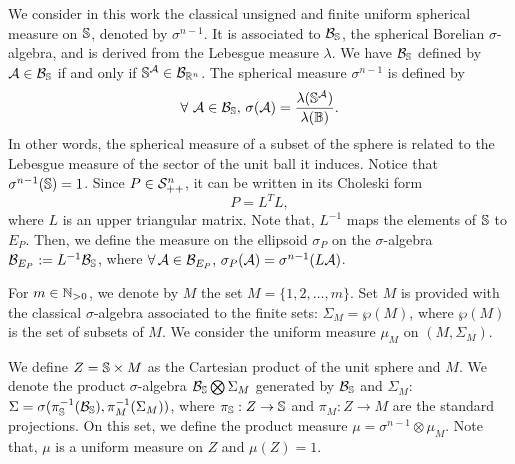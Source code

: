 We consider in this work the classical unsigned and finite uniform spherical measure on $\mathbb{S}$, denoted by $\sigma^{n-1}$. It is associated to $\mathcal{B}_{\mathbb{S}}$, the spherical Borelian $\sigma$-algebra, and is derived from the Lebesgue measure $\lambda$. We have $\mathcal{B}_{\mathbb{S}}$ defined by $\mathcal{A} \in \mathcal{B}_{\mathbb{S}}$ if and only if $\mathbb{S}^{\mathcal{A}} \in \mathcal{B}_{\mathbb{R}^n}$. The spherical measure $\sigma^{n-1}$ is defined by
$$\forall\ \mathcal{A} \in \mathcal{B}_{\mathbb{S}},\, \sigma(\mathcal{A}) = \frac{\lambda(\mathbb{S}^{\mathcal{A}})}{\lambda(\mathbb{B})}. $$
In other words, the spherical measure of a subset of the sphere is related to the Lebesgue measure of the sector of the unit ball it induces. Notice that $\sigma^{n-1}(\mathbb{S}) = 1$.
Since $P \in \mathcal{S}_{++}^n$, it can be written in its Choleski form \begin{equation}\label{choleski}P = L^TL,\end{equation} where $L$ is an upper triangular matrix. Note that, $L^{-1}$ maps the elements of $\mathbb{S}$ to $E_P$. Then, we define the measure on the ellipsoid $\sigma_P$ on the $\sigma$-algebra $\mathcal{B}_{E_P}:=L^{-1}\mathcal{B}_{\mathbb{S}}$, where $\forall\, \mathcal{A} \in \mathcal{B}_{E_P},\, \sigma_P({\mathcal{A}}) = \sigma^{n-1}(L\mathcal{A})$. 

%
%
%


For $m \in \mathbb{N}_{>0}$, we denote by $M$ the set $M=\{1,2, \ldots,m \}$. Set $M$ is provided with the classical $\sigma$-algebra associated to the finite sets: $\Sigma_M = \wp(M)$, where $\wp(M)$ is the set of subsets of $M$. We consider the uniform measure $\mu_M$ on $(M, \Sigma_M)$. 

We define $Z = \mathbb{S} \times M$ as the Cartesian product of the unit sphere and $M$. We denote the product $\sigma$-algebra $\mathcal{B}_{\mathbb{S}} \bigotimes \Sigma_M$ generated by $\mathcal{B}_{\mathbb{S}}$ and $\Sigma_M$: $\Sigma = \sigma( \pi_{\mathbb{S}}^{-1}(\mathcal{B}_{\mathbb{S}}),  \pi_{M}^{-1}(\Sigma_M))$, where $\pi_{\mathbb{S}}:Z \to \mathbb{S}$ and $\pi_M: Z \to M$ are the standard projections. On this set, we define the product measure $\mu = \sigma^{n-1} \otimes \mu_M$. Note that, $\mu$ is a uniform measure on $Z$ and $\mu(Z)=1$.  
